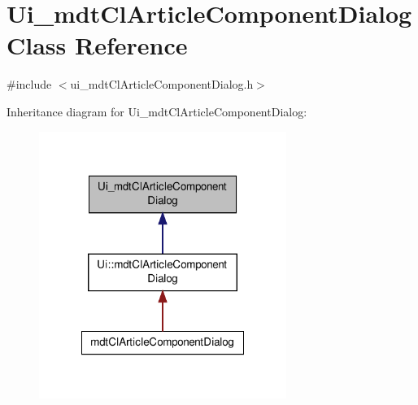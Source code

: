 \hypertarget{class_ui__mdt_cl_article_component_dialog}{\section{Ui\-\_\-mdt\-Cl\-Article\-Component\-Dialog Class Reference}
\label{class_ui__mdt_cl_article_component_dialog}
}


{\ttfamily \#include $<$ui\-\_\-mdt\-Cl\-Article\-Component\-Dialog.\-h$>$}



Inheritance diagram for Ui\-\_\-mdt\-Cl\-Article\-Component\-Dialog\-:\nopagebreak
\begin{figure}[H]
\begin{center}
\leavevmode
\includegraphics[width=228pt]{class_ui__mdt_cl_article_component_dialog__inherit__graph}
\end{center}
\end{figure}


